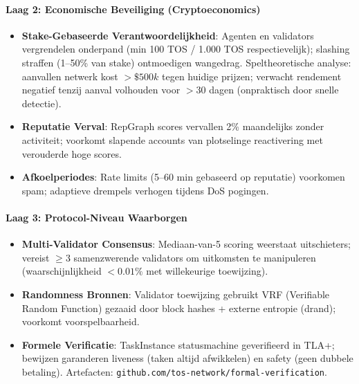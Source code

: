 \documentclass[11pt]{article}
\begin{document}
\paragraph{Laag 2: Economische Beveiliging (Cryptoeconomics)}
\begin{itemize}[noitemsep]
  \item \textbf{Stake-Gebaseerde Verantwoordelijkheid}: Agenten en validators vergrendelen onderpand (min 100 TOS / 1.000 TOS respectievelijk); slashing straffen (1--50\% van stake) ontmoedigen wangedrag. Speltheoretische analyse: aanvallen netwerk kost $>\$500k$ tegen huidige prijzen; verwacht rendement negatief tenzij aanval volhouden voor $>30$ dagen (onpraktisch door snelle detectie).
  \item \textbf{Reputatie Verval}: RepGraph scores vervallen 2\% maandelijks zonder activiteit; voorkomt slapende accounts van plotselinge reactivering met verouderde hoge scores.
  \item \textbf{Afkoelperiodes}: Rate limits (5--60 min gebaseerd op reputatie) voorkomen spam; adaptieve drempels verhogen tijdens DoS pogingen.
\end{itemize}

\paragraph{Laag 3: Protocol-Niveau Waarborgen}
\begin{itemize}[noitemsep]
  \item \textbf{Multi-Validator Consensus}: Mediaan-van-5 scoring weerstaat uitschieters; vereist $\geq3$ samenzwerende validators om uitkomsten te manipuleren (waarschijnlijkheid $<0.01\%$ met willekeurige toewijzing).
  \item \textbf{Randomness Bronnen}: Validator toewijzing gebruikt VRF (Verifiable Random Function) gezaaid door block hashes + externe entropie (drand); voorkomt voorspelbaarheid.
  \item \textbf{Formele Verificatie}: TaskInstance statusmachine geverifieerd in TLA+; bewijzen garanderen liveness (taken altijd afwikkelen) en safety (geen dubbele betaling). Artefacten: \texttt{github.com/tos-network/formal-verification}.
\end{itemize}
\end{document}
